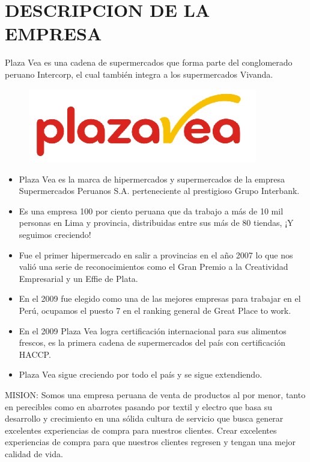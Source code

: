 \section{DESCRIPCION DE LA EMPRESA} 

Plaza Vea es una cadena de supermercados que forma parte del conglomerado peruano Intercorp, el cual también integra a los supermercados Vivanda.

			\begin{figure}[htb]
				\begin{center}
					\includegraphics[width=10cm]{./Imagenes/3}
				\end{center}
			\end{figure}

	\begin{itemize}
   	 \item Plaza Vea es la marca de hipermercados y supermercados de la empresa Supermercados Peruanos S.A. perteneciente al prestigioso Grupo Interbank.
	\item	Es una empresa 100 por ciento peruana que da trabajo a más de 10 mil personas en Lima y provincia, distribuidas entre sus más de 80 tiendas, ¡Y seguimos creciendo!
	\item	Fue el primer hipermercado en salir a provincias en el año 2007 lo que nos valió una serie de reconocimientos como el Gran Premio a la Creatividad Empresarial y un Effie de Plata.
	\item	En el 2009 fue elegido como una de las mejores empresas para trabajar en el Perú, ocupamos el puesto 7 en el ranking general de Great Place to work.
	\item	En el 2009 Plaza Vea logra certificación internacional para sus alimentos frescos, es la primera cadena de supermercados del país con certificación HACCP.
	\item	Plaza Vea sigue creciendo por todo el país y se sigue extendiendo.

    
 	 \end{itemize}

MISION:
Somos una empresa peruana de venta de productos al por menor, tanto en perecibles como en abarrotes pasando por textil y electro que basa su desarrollo y crecimiento en una sólida cultura de servicio que busca generar excelentes experiencias de compra para nuestros clientes. Crear excelentes experiencias de compra para que nuestros clientes regresen y tengan una mejor calidad de vida.

